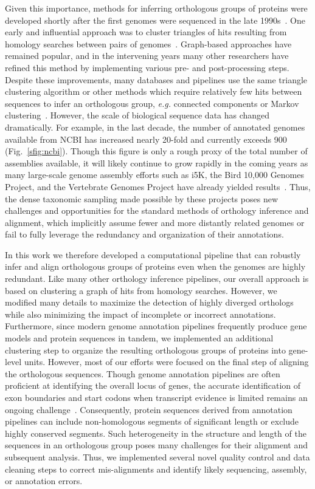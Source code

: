 \documentclass[10pt,letterpaper]{article}
\begin{document}
Given this importance, methods for inferring orthologous groups of proteins were developed shortly after the first genomes were sequenced in the late 1990s~\cite{Fleischmann1995, Goffeau1996, CESC1998}. One early and influential approach was to cluster triangles of hits resulting from homology searches between pairs of genomes~\cite{Tatusov1997}. Graph-based approaches have remained popular, and in the intervening years many other researchers have refined this method by implementing various pre- and post-processing steps. Despite these improvements, many databases and pipelines use the same triangle clustering algorithm or other methods which require relatively few hits between sequences to infer an orthologous group, \textit{e.g.} connected components or Markov clustering~\cite{Remm2001, Li2003, Jensen2007, Linard2011, Emms2015, Train2017, Cosentino2018}. However, the scale of biological sequence data has changed dramatically. For example, in the last decade, the number of annotated genomes available from NCBI has increased nearly 20-fold and currently exceeds 900 (Fig.~\ref{sfig:ncbi}). Though this figure is only a rough proxy of the total number of assemblies available, it will likely continue to grow rapidly in the coming years as many large-scale genome assembly efforts such as i5K, the Bird 10,000 Genomes Project, and the Vertebrate Genomes Project have already yielded results~\cite{Thomas2020, Feng2020, Rhie2021}. Thus, the dense taxonomic sampling made possible by these projects poses new challenges and opportunities for the standard methods of orthology inference and alignment, which implicitly assume fewer and more distantly related genomes or fail to fully leverage the redundancy and organization of their annotations.

In this work we therefore developed a computational pipeline that can robustly infer and align orthologous groups of proteins even when the genomes are highly redundant. Like many other orthology inference pipelines, our overall approach is based on clustering a graph of hits from homology searches. However, we modified many details to maximize the detection of highly diverged orthologs while also minimizing the impact of incomplete or incorrect annotations. Furthermore, since modern genome annotation pipelines frequently produce gene models and protein sequences in tandem, we implemented an additional clustering step to organize the resulting orthologous groups of proteins into gene-level units. However, most of our efforts were focused on the final step of aligning the orthologous sequences. Though genome annotation pipelines are often proficient at identifying the overall locus of genes, the accurate identification of exon boundaries and start codons when transcript evidence is limited remains an ongoing challenge~\cite{Frankish2015, Dunne2018}. Consequently, protein sequences derived from annotation pipelines can include non-homologous segments of significant length or exclude highly conserved segments. Such heterogeneity in the structure and length of the sequences in an orthologous group poses many challenges for their alignment and subsequent analysis. Thus, we implemented several novel quality control and data cleaning steps to correct mis-alignments and identify likely sequencing, assembly, or annotation errors.
\end{document}

